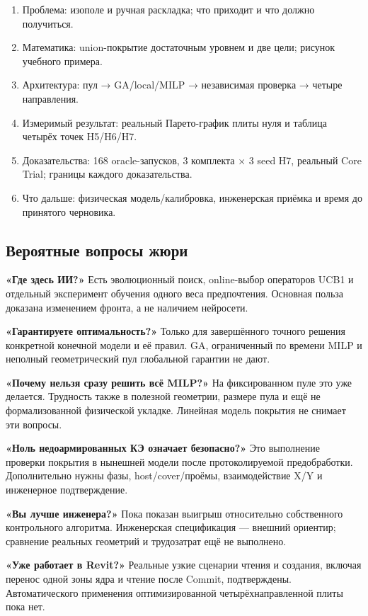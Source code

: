 \documentclass[11pt,a4paper]{article}
\begin{document}
\begin{enumerate}
\item Проблема: изополе и ручная раскладка; что приходит и что должно получиться.
\item Математика: union-покрытие достаточным уровнем и две цели; рисунок учебного примера.
\item Архитектура: пул → GA/local/MILP → независимая проверка → четыре направления.
\item Измеримый результат: реальный Парето-график плиты нуля и таблица четырёх точек H5/H6/H7.
\item Доказательства: 168 oracle-запусков, 3 комплекта × 3 seed H7, реальный Core Trial; границы каждого доказательства.
\item Что дальше: физическая модель/калибровка, инженерская приёмка и время до принятого черновика.
\end{enumerate}

\subsection{Вероятные вопросы жюри}

\textbf{«Где здесь ИИ?»} Есть эволюционный поиск, online-выбор операторов UCB1 и отдельный эксперимент обучения одного веса предпочтения. Основная польза доказана изменением фронта, а не наличием нейросети.


\textbf{«Гарантируете оптимальность?»} Только для завершённого точного решения конкретной конечной модели и её правил. GA, ограниченный по времени MILP и неполный геометрический пул глобальной гарантии не дают.


\textbf{«Почему нельзя сразу решить всё MILP?»} На фиксированном пуле это уже делается. Трудность также в полезной геометрии, размере пула и ещё не формализованной физической укладке. Линейная модель покрытия не снимает эти вопросы.


\textbf{«Ноль недоармированных КЭ означает безопасно?»} Это выполнение проверки покрытия в нынешней модели после протоколируемой предобработки. Дополнительно нужны фазы, host/cover/проёмы, взаимодействие X/Y и инженерное подтверждение.


\textbf{«Вы лучше инженера?»} Пока показан выигрыш относительно собственного контрольного алгоритма. Инженерская спецификация — внешний ориентир; сравнение реальных геометрий и трудозатрат ещё не выполнено.


\textbf{«Уже работает в Revit?»} Реальные узкие сценарии чтения и создания, включая перенос одной зоны ядра и чтение после Commit, подтверждены. Автоматического применения оптимизированной четырёхнаправленной плиты пока нет.
\end{document}
